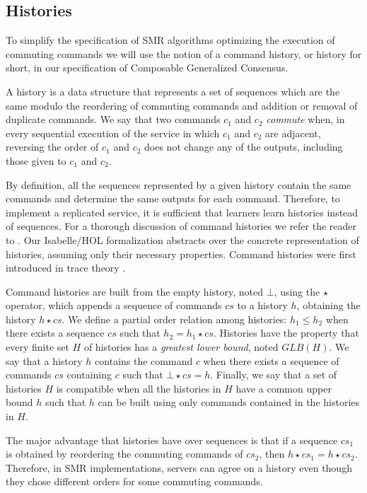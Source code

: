 \subsection{Histories}

To simplify the specification of SMR algorithms optimizing the execution of commuting commands 
we will use the notion of a command history, or history for short, in our specification of Composable Generalized Consensus.

A history is a data structure that
represents a set of sequences which are the same modulo the reordering
of commuting commands and addition or removal of duplicate commands.
We say that two commands $c_1$ and $c_2$ \emph{commute} when, in every
sequential execution of the service in which $c_1$ and $c_2$ are adjacent,
reversing the order of $c_1$ and $c_2$ does not change any of the outputs,
including those given to $c_1$ and $c_2$.

By definition, all the sequences represented by a given history contain the same commands
and determine the same outputs for each command. Therefore, to implement a
replicated service, it is sufficient that learners learn histories instead of
sequences. For a thorough discussion of command histories we refer the reader
to \cite{Lamport05GeneralizeConsensus}. 
Our Isabelle/HOL formalization abstracts over the concrete representation of histories, assuming only their
necessary properties. Command histories were first introduced in trace theory
\cite{Mazurkiewicz84Semantics}.

Command histories are built from the empty history, noted $\bot$, using the $\star$
operator, which appends a sequence of commands $cs$ to a history $h$, obtaining
the history $h \star cs$. We define a partial order relation among
histories: $h_1 \leq h_2$ when there exists a sequence $cs$ such that $h_2 = h_1
\star cs$. Histories have the property that every finite set $H$ of histories
has a \emph{greatest lower bound}, noted $GLB\left(H\right)$. 
We say that a history $h$ contains the command $c$ when there exists a sequence of commands 
$cs$ containing $c$ such that $\bot \star cs = h$.
Finally, we say
that a set of histories $H$ is compatible when all the histories in $H$ have a
common upper bound $h$ such that $h$ can be built using only commands contained in
the histories in $H$.

The major advantage that histories have over sequences is that if a sequence
$cs_1$ is obtained by reordering the commuting commands of $cs_2$, then $h \star
cs_1 = h \star cs_2$. Therefore, in SMR implementations, servers can agree on
a history even though they chose different orders for some commuting commands.

